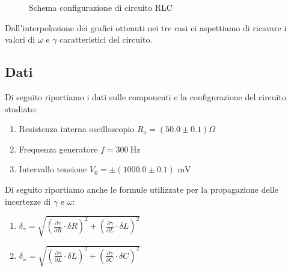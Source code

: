 \documentclass[letterpaper,12pt]{article}
\begin{document}
\begin{figure}[h!]
    \centering
    \caption{Schema configurazione di circuito RLC}
    \label{fig:config_circuito_RLC}
\end{figure}

Dall'interpolazione dei grafici ottenuti nei tre casi ci aspettiamo di ricavare i valori di $\omega$ e $\gamma$ caratteristici del circuito.
\newpage

\subsection{Dati} %
Di seguito riportiamo i dati sulle componenti e la configurazione del circuito studiato:

\begin{enumerate}[itemsep=1pt]
    \item Resistenza interna oscilloscopio $R_o = (50.0\pm0.1)\Omega$  
    \item Frequenza generatore $f = \SI{300}{\hertz}$
    \item Intervallo tensione $V_0= \pm (1000.0\pm0.1)\text{ mV}$ 
\end{enumerate}
Di seguito riportiamo anche le formule utilizzate per la propagazione delle incertezze di $\gamma$ e $\omega$:
\begin{enumerate}
    \item $ \delta_{\gamma} = \sqrt{(\frac{\partial \gamma}{\partial R} \cdot \delta R)^2 + (\frac{\partial \gamma}{\partial L}\cdot \delta L)^2} $
    \item $ \delta_{\omega} = \sqrt{(\frac{\partial \gamma}{\partial L} \cdot \delta L)^2 + (\frac{\partial \gamma}{\partial C}\cdot \delta C)^2} $
\end{enumerate}
\newpage
\end{document}
